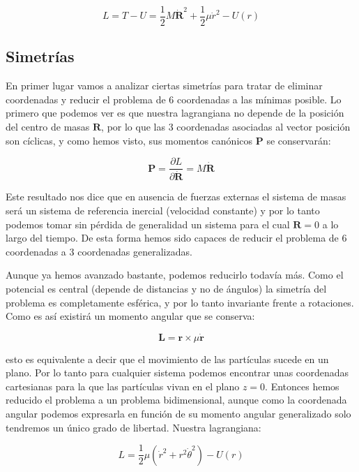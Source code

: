 \documentclass[12pt,a4paper]{book}
\newcommand{\parciales}[2]{\frac{\partial #1}{\partial #2}}
\newcommand{\rn}{\mathbf{r}}
\newcommand{\Rn}{\mathbf{R}}
\newcommand{\Ln}{\mathbf{L}}
\newcommand{\Pn}{\mathbf{P}}
\begin{document}
\begin{equation}
L = T- U  =  \frac{1}{2} M \dot{\Rn}^2 + \dfrac{1}{2} \mu \dot{r}^2 - U(r)
\end{equation}

\subsection{Simetrías}

En primer lugar vamos a analizar ciertas simetrías para tratar de eliminar coordenadas y reducir el problema de 6 coordenadas a las mínimas posible. Lo primero que podemos ver es que nuestra lagrangiana no depende de la posición del centro de masas $\Rn$, por lo que las 3 coordenadas asociadas al vector posición son cíclicas, y como hemos visto, sus momentos canónicos $\Pn$ se conservarán:

\begin{equation}
\Pn  = \parciales{L}{\dot{\Rn}}  = M \dot{\Rn} 
\end{equation}

Este resultado nos dice que en ausencia de fuerzas externas el sistema de masas será un sistema de referencia inercial (velocidad constante) y por lo tanto podemos tomar sin pérdida de generalidad un sistema para el cual $\Rn = 0$ a lo largo del tiempo. De esta forma hemos sido capaces de reducir el problema de 6 coordenadas a 3 coordenadas generalizadas. 

Aunque ya hemos avanzado bastante, podemos reducirlo todavía más. Como el potencial es central (depende de distancias y no de ángulos) la simetría del problema es completamente esférica, y por lo tanto invariante frente a rotaciones. Como es así existirá un momento angular que se conserva:

\begin{equation}
\Ln = \rn \times \mu \dot{\rn}
\end{equation}

esto es equivalente a decir que el movimiento de las partículas sucede en un plano. Por lo tanto para cualquier sistema podemos encontrar unas coordenadas cartesianas para la que las partículas vivan en el plano $z=0$. Entonces hemos reducido el problema a un problema bidimensional, aunque como la coordenada angular podemos expresarla en función de su momento angular generalizado solo tendremos un único grado de libertad. Nuestra lagrangiana:

\begin{equation}
L = \frac{1}{2} \mu (\dot{r}^2 + r^2 \dot{\theta}^2 ) - U(r)
\end{equation}
\end{document}
